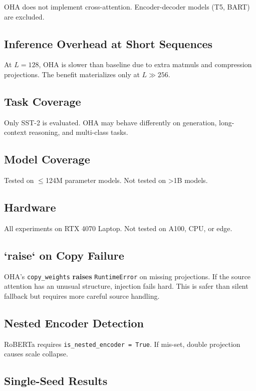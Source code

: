 OHA does not implement cross-attention. Encoder-decoder models (T5, BART) 
are excluded.

\subsection{Inference Overhead at Short Sequences}

At $L = 128$, OHA is slower than baseline due to extra matmuls and 
compression projections. The benefit materializes only at $L \gg 256$.

\subsection{Task Coverage}

Only SST-2 is evaluated. OHA may behave differently on generation, 
long-context reasoning, and multi-class tasks.

\subsection{Model Coverage}

Tested on $\le$124M parameter models. Not tested on >1B models.

\subsection{Hardware}

All experiments on RTX 4070 Laptop. Not tested on A100, CPU, or edge.

\subsection{`raise` on Copy Failure}

OHA's \texttt{copy\_weights} \textbf{raises} \texttt{RuntimeError} on missing projections. If 
the source attention has an unusual structure, injection fails hard. This 
is safer than silent fallback but requires more careful source handling.

\subsection{Nested Encoder Detection}

RoBERTa requires \texttt{is\_nested\_encoder = True}. If mis-set, double projection 
causes scale collapse.

\subsection{Single-Seed Results}

